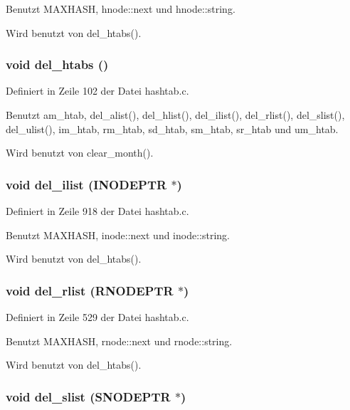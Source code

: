 Benutzt MAXHASH, hnode::next und hnode::string.

Wird benutzt von del\_\-htabs().
\subsubsection{\setlength{\rightskip}{0pt plus 5cm}void del\_\-htabs ()}\label{hashtab_8h_f9fcdad76e91434fe5f0728f3a79ae74}




Definiert in Zeile 102 der Datei hashtab.c.

Benutzt am\_\-htab, del\_\-alist(), del\_\-hlist(), del\_\-ilist(), del\_\-rlist(), del\_\-slist(), del\_\-ulist(), im\_\-htab, rm\_\-htab, sd\_\-htab, sm\_\-htab, sr\_\-htab und um\_\-htab.

Wird benutzt von clear\_\-month().
\subsubsection{\setlength{\rightskip}{0pt plus 5cm}void del\_\-ilist ({\bf INODEPTR} $\ast$)}\label{hashtab_8h_bbc125dd817affa56cc6bcc60c485079}




Definiert in Zeile 918 der Datei hashtab.c.

Benutzt MAXHASH, inode::next und inode::string.

Wird benutzt von del\_\-htabs().
\subsubsection{\setlength{\rightskip}{0pt plus 5cm}void del\_\-rlist ({\bf RNODEPTR} $\ast$)}\label{hashtab_8h_66b8b1a1eb435b152cb668f00f545a77}




Definiert in Zeile 529 der Datei hashtab.c.

Benutzt MAXHASH, rnode::next und rnode::string.

Wird benutzt von del\_\-htabs().
\subsubsection{\setlength{\rightskip}{0pt plus 5cm}void del\_\-slist ({\bf SNODEPTR} $\ast$)}\label{hashtab_8h_75fb07de23e0c974422e5b44a587dfca}




